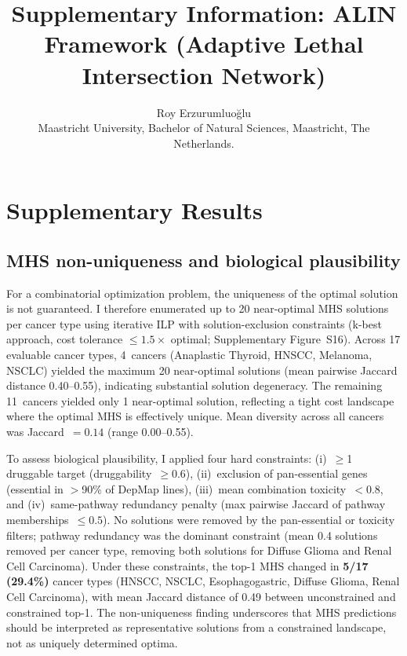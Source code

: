 \documentclass[11pt]{article}
\begin{document}
\title{Supplementary Information: ALIN Framework (Adaptive Lethal Intersection Network)}
\author{Roy Erzurumluoğlu\\
  Maastricht University, Bachelor of Natural Sciences, Maastricht, The Netherlands.}
\maketitle

\tableofcontents
\newpage


\section{Supplementary Results}

\subsection{MHS non-uniqueness and biological plausibility}
\label{sec:mhs_nonunique}
For a combinatorial optimization problem, the uniqueness of the optimal solution is not guaranteed. I therefore enumerated up to 20 near-optimal MHS solutions per cancer type using iterative ILP with solution-exclusion constraints (k-best approach, cost tolerance $\leq 1.5\times$ optimal; Supplementary Figure~S16). Across 17 evaluable cancer types, 4~cancers (Anaplastic Thyroid, HNSCC, Melanoma, NSCLC) yielded the maximum 20 near-optimal solutions (mean pairwise Jaccard distance 0.40--0.55), indicating substantial solution degeneracy. The remaining 11~cancers yielded only 1 near-optimal solution, reflecting a tight cost landscape where the optimal MHS is effectively unique. Mean diversity across all cancers was Jaccard~$= 0.14$ (range 0.00--0.55).

To assess biological plausibility, I applied four hard constraints: (i)~$\geq$1 druggable target (druggability~$\geq 0.6$), (ii)~exclusion of pan-essential genes (essential in $>$90\% of DepMap lines), (iii)~mean combination toxicity~$< 0.8$, and (iv)~same-pathway redundancy penalty (max pairwise Jaccard of pathway memberships~$\leq 0.5$). No solutions were removed by the pan-essential or toxicity filters; pathway redundancy was the dominant constraint (mean 0.4 solutions removed per cancer type, removing both solutions for Diffuse Glioma and Renal Cell Carcinoma). Under these constraints, the top-1 MHS changed in \textbf{5/17 (29.4\%)} cancer types (HNSCC, NSCLC, Esophagogastric, Diffuse Glioma, Renal Cell Carcinoma), with mean Jaccard distance of 0.49 between unconstrained and constrained top-1. The non-uniqueness finding underscores that MHS predictions should be interpreted as representative solutions from a constrained landscape, not as uniquely determined optima.
\end{document}
